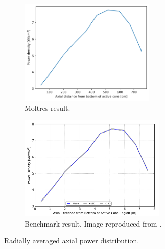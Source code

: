\documentclass[11pt,letterpaper]{article}
\begin{document}
\begin{figure}[htbp!]
  \centering
  \begin{subfigure}[t]{0.4\textwidth}
    \centering
    \includegraphics[height=5cm]{figures/3D-fullcore26G-axialpower}
    \caption{Moltres result.}
  \end{subfigure}
  \begin{subfigure}[t]{0.4\textwidth}
    \centering
    \includegraphics[height=5cm]{figures/benchmark-axialpower}
    \caption{Benchmark result. Image reproduced from \cite{oecd_nea_coupled_2020}.}
  \end{subfigure}
  \hfill
  \caption{Radially averaged axial power distribution.}
  \label{fig:axialpower}
\end{figure}
\end{document}
